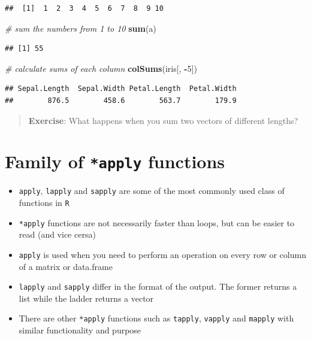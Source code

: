 \documentclass[]{book}
\makeatletter
\newenvironment{Shaded}{\begin{snugshade}}{\end{snugshade}}
\newcommand{\KeywordTok}[1]{\textcolor[rgb]{0.13,0.29,0.53}{\textbf{#1}}}
\newcommand{\DecValTok}[1]{\textcolor[rgb]{0.00,0.00,0.81}{#1}}
\newcommand{\CommentTok}[1]{\textcolor[rgb]{0.56,0.35,0.01}{\textit{#1}}}
\newcommand{\OperatorTok}[1]{\textcolor[rgb]{0.81,0.36,0.00}{\textbf{#1}}}
\newcommand{\NormalTok}[1]{#1}
\providecommand{\tightlist}{%
  \setlength{\itemsep}{0pt}\setlength{\parskip}{0pt}}
\newenvironment{kframe}{%
\medskip{}
\setlength{\fboxsep}{.8em}
 \def\at@end@of@kframe{}%
 \ifinner\ifhmode%
  \def\at@end@of@kframe{\end{minipage}}%
  \begin{minipage}{\columnwidth}%
 \fi\fi%
 \def\FrameCommand##1{\hskip\@totalleftmargin \hskip-\fboxsep
 \colorbox{shadecolor}{##1}\hskip-\fboxsep
     \hskip-\linewidth \hskip-\@totalleftmargin \hskip\columnwidth}%
 \MakeFramed {\advance\hsize-\width
   \@totalleftmargin\z@ \linewidth\hsize
   \@setminipage}}%
 {\par\unskip\endMakeFramed%
 \at@end@of@kframe}
\renewenvironment{Shaded}{\begin{kframe}}{\end{kframe}}
\theoremstyle{definition}
\theoremstyle{definition}
\theoremstyle{definition}
\theoremstyle{remark}
\makeatother
\begin{document}
\begin{verbatim}
##  [1]  1  2  3  4  5  6  7  8  9 10
\end{verbatim}

\begin{Shaded}
\begin{Highlighting}[]
\CommentTok{# sum the numbers from 1 to 10}
\KeywordTok{sum}\NormalTok{(a)}
\end{Highlighting}
\end{Shaded}

\begin{verbatim}
## [1] 55
\end{verbatim}

\begin{Shaded}
\begin{Highlighting}[]
\CommentTok{# calculate sums of each column}
\KeywordTok{colSums}\NormalTok{(iris[, }\OperatorTok{-}\DecValTok{5}\NormalTok{])}
\end{Highlighting}
\end{Shaded}

\begin{verbatim}
## Sepal.Length  Sepal.Width Petal.Length  Petal.Width 
##        876.5        458.6        563.7        179.9
\end{verbatim}

\begin{quote}
\textbf{Exercise}: What happens when you sum two vectors of different
lengths?
\end{quote}

\section{\texorpdfstring{Family of \texttt{*apply}
functions}{Family of *apply functions}}\label{family-of-apply-functions}

\begin{itemize}
\tightlist
\item
  \texttt{apply}, \texttt{lapply} and \texttt{sapply} are some of the
  most commonly used class of functions in \texttt{R}
\item
  \texttt{*apply} functions are not necessarily faster than loops, but
  can be easier to read (and vice cersa)
\item
  \texttt{apply} is used when you need to perform an operation on every
  row or column of a matrix or data.frame
\item
  \texttt{lapply} and \texttt{sapply} differ in the format of the
  output. The former returns a list while the ladder returns a vector
\item
  There are other \texttt{*apply} functions such as \texttt{tapply},
  \texttt{vapply} and \texttt{mapply} with similar functionality and
  purpose
\end{itemize}
\end{document}
